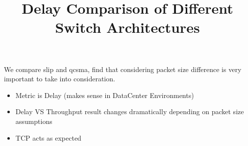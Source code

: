 \documentclass{IEEEtran}%
\begin{document}
\title{Delay Comparison of Different Switch Architectures}



\author{}






\maketitle

{\abstract
 We compare slip and qcsma, find that considering packet size difference is very important to take into consideration.
\begin{itemize}
\item Metric is Delay (makes sense in DataCenter Environments)
\item Delay VS Throughput result changes dramatically depending on packet size assumptions
\item TCP acts as expected
\end{itemize}
}
\end{document}
